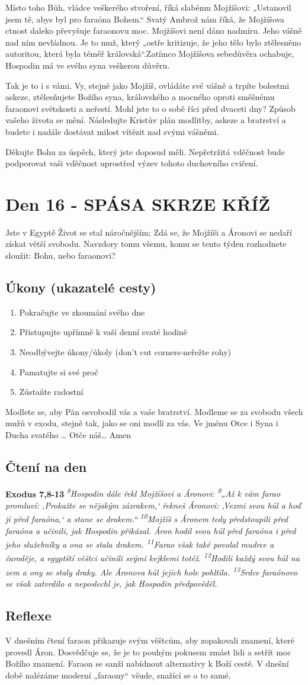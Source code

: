 \documentclass[11pt]{article}
\newcommand{\zacatekTretiTyden}{
  Jste v Egyptě \newline
  Život se stal náročnějším; Zdá se, že Mojžíši a Áronovi se nedaří získat větší svobodu. Navzdory tomu všemu,
komu se tento týden rozhodnete sloužit: Bohu, nebo faraonovi?

\subsection*{Úkony (ukazatelé cesty)}
\begin{enumerate}
  \item Pokračujte ve zkoumání svého dne
  \item Přistupujte upřímně k vaší denní svaté hodině
  \item Neodbývejte úkony/úkoly (don’t cut corners-neřežte rohy)
  \item Pamatujte si své proč
  \item Zůstaňte radostní
\end{enumerate}
Modlete se, aby Pán osvobodil vás a vaše bratrství. \newline
Modleme se za svobodu všech mužů v exodu, stejně tak, jako se oni modlí za vás.\newline
Ve jménu Otce i Syna i Ducha svatého …  Otče náš… Amen
}
\begin{document}
Místo toho Bůh, vládce veškerého stvoření, říká slabému Mojžíšovi: „Ustanovil jsem tě, abys byl pro faraóna
Bohem.“ Svatý Ambrož nám říká, že Mojžíšova ctnost daleko převyšuje faraonovu moc. Mojžíšovi není dáno
nadmíru. Jeho vášně nad ním nevládnou. Je to muž, který „ostře kritizuje, že jeho tělo bylo ztělesněno autoritou,
která byla téměř královská“.Zatímco Mojžíšova sebedůvěra ochabuje, Hospodin má ve svého syna veškerou
důvěru.

Tak je to i s vámi. Vy, stejně jako Mojžíš, ovládáte své vášně a trpíte bolestmi askeze, ztělesňujete Božího syna,
královského a mocného oproti směšnému faraonovi světskosti a neřestí. Mohl jste to o sobě říci před dvaceti dny?
Způsob vašeho života se mění. Následujte Kristův plán modlitby, askeze a bratrství a budete i nadále dostávat
milost vítězit nad svými vášněmi.

Děkujte Bohu za úspěch, který jste doposud měli. Nepřetržitá vděčnost bude podporovat vaši vděčnost uprostřed
výzev tohoto duchovního cvičení.

\newpage
\section{Den 16 - SPÁSA SKRZE KŘÍŽ}
\zacatekTretiTyden
\subsection*{Čtení na den}
\textbf{Exodus 7,8-13}
\newline
\textit{
\textsuperscript{8}Hospodin dále řekl Mojžíšovi a Áronovi:
\textsuperscript{9}„Až k vám farao promluví: ‚Prokažte se nějakým zázrakem,‘ řekneš Áronovi: ‚Vezmi svou hůl a hoď ji před faraóna,‘ a stane se drakem.“
\textsuperscript{10}Mojžíš s Áronem tedy předstoupili před faraóna a učinili, jak Hospodin přikázal. Áron hodil svou hůl před faraóna i před jeho služebníky a ona se stala drakem.
\textsuperscript{11}Farao však také povolal mudrce a čaroděje, a egyptští věštci učinili svými kejklemi totéž.
\textsuperscript{12}Hodili každý svou hůl na zem a ony se staly draky. Ale Áronova hůl jejich hole pohltila.
\textsuperscript{13}Srdce faraónovo se však zatvrdilo a neposlechl je, jak Hospodin předpověděl.
}

\subsection*{Reflexe}

V dnešním čtení faraon přikazuje svým věštcům, aby zopakovali znamení, které provedl Áron.
Dosvědčuje se, že je to pouhým pokusem zmást lidi a setřít moc Božího znamení. Faraon se sanží
nabídnout alternativy k Boží cestě. V dnešní době nalézáme moderní „faraony“ všude, snažící se o to
samé.
\end{document}
